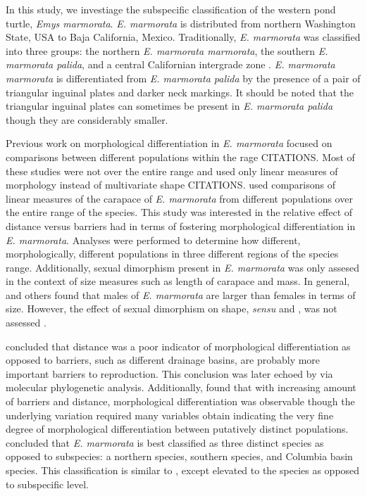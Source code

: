 \documentclass[12pt,letterpaper]{article}\usepackage{graphicx, color}
\begin{document}
In this study, we investiage the subspecific classification of the western pond turtle, \textit{Emys marmorata}. \textit{E. marmorata} is distributed from northern Washington State, USA to Baja California, Mexico.
Traditionally, \textit{E. marmorata} was classified into three groups: the northern \textit{E. marmorata marmorata}, the southern \textit{E. marmorata palida}, and a central Californian intergrade zone \citep{Seeliger1945}. \textit{E. marmorata marmorata} is differentiated from \textit{E. marmorata palida} by the presence of a pair of triangular inguinal plates and darker neck markings. It should be noted that the triangular inguinal plates can sometimes be present in \textit{E. marmorata palida} though they are considerably smaller.

Previous work on morphological differentiation in \textit{E. marmorata} focused on comparisons between different populations within the rage CITATIONS. Most of these studies were not over the entire range and used only linear measures of morphology instead of multivariate shape CITATIONS.
%
\citet{Holland1992} used comparisons of linear measures of the carapace of \textit{E. marmorata} from different populations over the entire range of the species. This study was interested in the relative effect of distance versus barriers had in terms of fostering morphological differentiation in \textit{E. marmorata}. Analyses were performed to determine how different, morphologically, different populations in three different regions of the species range. Additionally, sexual dimorphism present in \textit{E. marmorata} was only assesed in the context of size measures such as length of carapace and mass. In general, \citet{Holland1992} and others \citep{Lubcke2007,Germano2008} found that males of \textit{E. marmorata} are larger than females in terms of size. However, the effect of sexual dimorphism on shape, \textit{sensu} \citet{Kendall1977a} and \citet{Dryden1998a}, was not assessed \citep{Holland1992,Lubcke2007,Germano2008}.

\citet{Holland1992} concluded that distance was a poor indicator of morphological differentiation as opposed to barriers, such as different drainage basins, are probably more important barriers to reproduction. This conclusion was later echoed by \citet{Spinks2005} via molecular phylogenetic analysis. Additionally, \citet{Holland1992} found that with increasing amount of barriers and distance, morphological differentiation was observable though the underlying variation required many variables obtain indicating the very fine degree of morphological differentiation between putatively distinct populations. \citet{Holland1992} concluded that \textit{E. marmorata} is best classified as three distinct species as opposed to subspecies: a northern species, southern species, and Columbia basin species. This classification is similar to \citet{Seeliger1945}, except elevated to the species as opposed to subspecific level.
\end{document}

